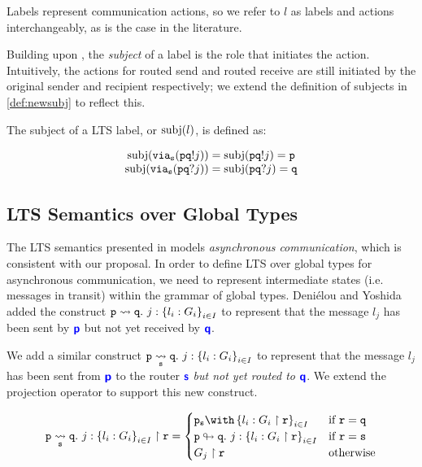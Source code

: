 Labels represent communication actions, so we refer
to $l$ as labels and actions interchangeably,
as is the case in the literature.

Building upon \cite{characterisation},
the \textit{subject} of a label is the role
that initiates the action. 
Intuitively, the actions for routed send and routed
receive are still initiated by the original sender and
recipient respectively;
we extend the definition
of subjects in \cref{def:newsubj} to reflect this.

\begin{definition}[Subject]
The subject of a LTS label, or $\subj{l}$, is defined as:

\doublespacing
\[
\begin{array}{c}
\subj{\via{s}{\aout{p}{q}{j}}} = 
	\subj{\aout{p}{q}{j}} = \mrole{p} \\
\subj{\via{s}{\ain{p}{q}{j}}} = 
	\subj{\ain{p}{q}{j}} = \mrole{q} \\
\end{array}
\]
\singlespacing
\label{def:newsubj}
\end{definition}

\subsection{LTS Semantics over Global Types}
\label{subsection:newltsglobal}

The LTS semantics presented in \cite{characterisation}
models \textit{asynchronous communication},
which is consistent with our proposal.
In order to define LTS over global types for
asynchronous communication, we need to
represent intermediate states (i.e. messages in transit)
within the grammar of global types.
Deni\'elou and Yoshida \cite{characterisation}
added the construct
{$\gtrans{p}{q}{j}{l_i: G_i}{i \in I}$}
to represent that the message $l_j$ has been
sent by $\role{p}$ but not yet received by $\role{q}$.

We add a similar construct
{$\gtransroute{p}{q}{s}{j}{l_i: G_i}{i \in I}$}
to represent that the message $l_j$ has
been sent from $\role{p}$ to the router $\role{s}$
\textit{but not yet routed to $\role{q}$}.
We extend the projection operator to 
support this new construct.

\[
\proj{\gtransroute{p}{q}{s}{j}{l_i: G_i}{i \in I}}{r} = \begin{cases}
\tbraproxy{p}{s}{l_i: \proj{G_i}{r}}{i \in I} 
	& \text{if } \mrole{r} = \mrole{q} \\
\routertrans{p}{q}{j}{l_i: \proj{G_i}{r}}{i \in I}
	& \text{if } \mrole{r} = \mrole{s} \\
\proj{G_j}{r}
	& \text{otherwise} \\
\end{cases}
\]

